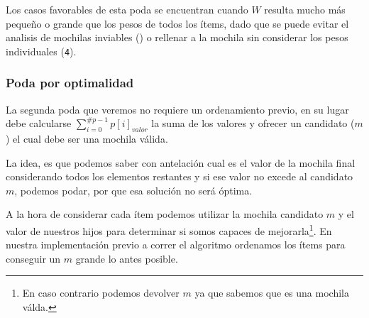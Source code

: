 \documentclass[fleqn, 11pt]{article}
\begin{document}
Los casos favorables de esta poda se encuentran cuando $W$ resulta mucho más
pequeño o grande que los pesos de todos los ítems, dado que se puede evitar el
analisis de mochilas inviables () o rellenar a la mochila sin
considerar los pesos individuales (\texttt{4}).

\subsubsection{Poda por optimalidad}

La segunda poda que veremos no requiere un ordenamiento previo, en su lugar
debe calcularse $\sum_{i = 0}^{\#p - 1}p[i]_{valor}$ la suma de los valores y ofrecer un candidato ($m$) el cual debe ser una mochila válida.

La idea, es que podemos saber con antelación cual es el valor de la mochila final considerando todos los elementos restantes y si ese valor no excede al candidato $m$, podemos podar, por que esa solución no será óptima.

A la hora de considerar cada ítem podemos utilizar la mochila candidato $m$ y
el valor de nuestros hijos para determinar si somos capaces de
mejorarla\footnote{En caso contrario podemos devolver $m$ ya que sabemos que es
una mochila válda.}. En nuestra implementación previo a correr el algoritmo
ordenamos los ítems para conseguir un $m$ grande lo antes posible.

\clearpage
\end{document}

